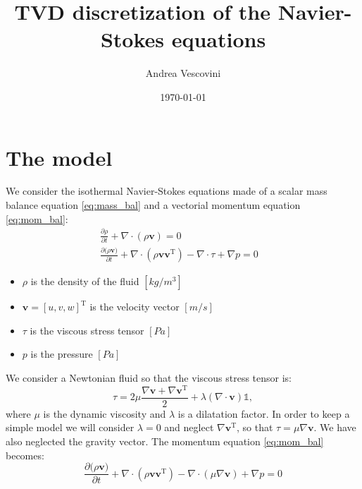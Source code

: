 \documentclass[12pt, a4paper]{article}
\title{\textbf{TVD discretization of the Navier-Stokes equations}}
\author{Andrea Vescovini}
\date{\today}
\begin{document}
	\maketitle

\section{The model}
We consider the isothermal Navier-Stokes equations made of a scalar mass 
balance equation \eqref{eq:mass_bal} and a vectorial momentum equation 
\eqref{eq:mom_bal}:
\begin{align}
	\label{eq:mass_bal} \frac{\partial\rho}{\partial t} + \nabla \cdot (\rho 
	\mathbf{v}) = 0&\\
	\label{eq:mom_bal} \frac{\partial{(\rho \mathbf{v}})}{\partial t} + \nabla 
	\cdot (\rho \mathbf{v} \mathbf{v^\mathrm{T}}) - \nabla \cdot \tau + 
	\nabla p = 0&
\end{align}
\begin{itemize}
	\item $\rho$ is the density of the fluid $[kg / m^3]$
	\item $\mathbf{v} = [u, v, w]^\mathrm{T}$ is the velocity vector $[m/s]$
	\item $\tau$ is the viscous stress tensor $[Pa]$
	\item $p$ is the pressure $[Pa]$
\end{itemize}
We consider a Newtonian fluid so that the viscous stress tensor is:
\begin{equation*}
\tau = 2\mu \frac{\nabla \mathbf{v} + \nabla \mathbf{v}^\mathrm{T}}{2} + 
\lambda (\nabla \cdot \mathbf{v}) \mathbb{1},
\end{equation*}
where $\mu$ is the dynamic viscosity and $\lambda$ is a 
dilatation factor. In order to keep a simple model we will consider 
$\lambda = 0$ and neglect $\nabla \mathbf{v}^\mathrm{T}$, so that $\tau = 
\mu \nabla \mathbf{v}$. We have also neglected the gravity vector.
The momentum equation \eqref{eq:mom_bal} becomes:
\begin{equation} \label{eq:mom_bal_simpl}
\frac{\partial{(\rho \mathbf{v}})}{\partial t} + \nabla 
\cdot (\rho \mathbf{v} \mathbf{v^\mathrm{T}}) - \nabla \cdot (\mu \nabla 
\mathbf{v}) + 
\nabla p = 0
\end{equation}
\end{document}
